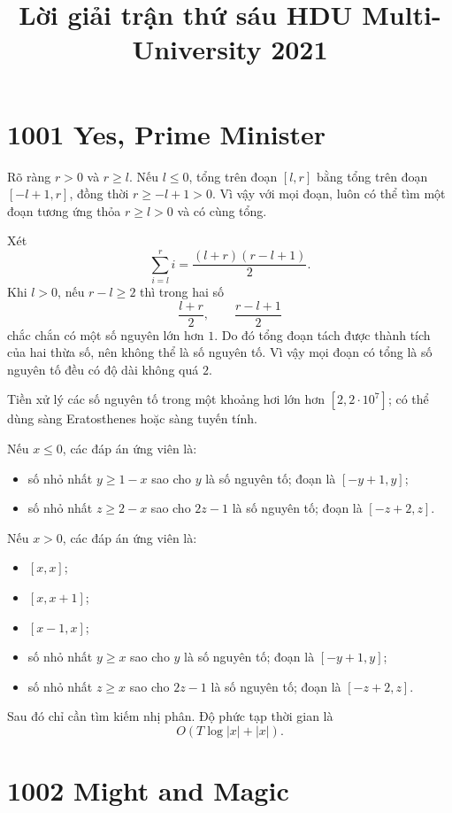 \documentclass[11pt]{article}
\title{Lời giải trận thứ sáu HDU Multi-University 2021}
\author{}
\date{}
\begin{document}
\maketitle


\section{1001 Yes, Prime Minister}

Rõ ràng $r>0$ và $r\ge l$. Nếu $l\le 0$, tổng trên đoạn $[l,r]$ bằng tổng
trên đoạn $[-l+1,r]$, đồng thời $r\ge -l+1>0$. Vì vậy với mọi đoạn, luôn có
thể tìm một đoạn tương ứng thỏa $r\ge l>0$ và có cùng tổng.

Xét
\[
  \sum_{i=l}^{r} i
  = \frac{(l+r)(r-l+1)}{2}.
\]
Khi $l>0$, nếu $r-l\ge 2$ thì trong hai số
\[
  \frac{l+r}{2},\qquad \frac{r-l+1}{2}
\]
chắc chắn có một số nguyên lớn hơn $1$. Do đó tổng đoạn tách được thành tích
của hai thừa số, nên không thể là số nguyên tố. Vì vậy mọi đoạn có tổng là
số nguyên tố đều có độ dài không quá $2$.

Tiền xử lý các số nguyên tố trong một khoảng hơi lớn hơn $[2,2\cdot 10^7]$;
có thể dùng sàng Eratosthenes hoặc sàng tuyến tính.

Nếu $x\le 0$, các đáp án ứng viên là:
\begin{itemize}
  \item số nhỏ nhất $y\ge 1-x$ sao cho $y$ là số nguyên tố; đoạn là
  $[-y+1,y]$;
  \item số nhỏ nhất $z\ge 2-x$ sao cho $2z-1$ là số nguyên tố; đoạn là
  $[-z+2,z]$.
\end{itemize}

Nếu $x>0$, các đáp án ứng viên là:
\begin{itemize}
  \item $[x,x]$;
  \item $[x,x+1]$;
  \item $[x-1,x]$;
  \item số nhỏ nhất $y\ge x$ sao cho $y$ là số nguyên tố; đoạn là
  $[-y+1,y]$;
  \item số nhỏ nhất $z\ge x$ sao cho $2z-1$ là số nguyên tố; đoạn là
  $[-z+2,z]$.
\end{itemize}

Sau đó chỉ cần tìm kiếm nhị phân. Độ phức tạp thời gian là
\[
  O(T\log |x|+|x|).
\]

\section{1002 Might and Magic}
\end{document}
